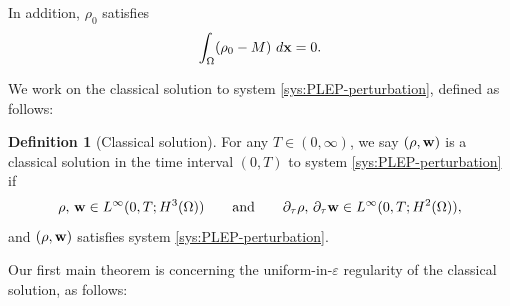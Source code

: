 \documentclass[11pt]{article}
\theoremstyle{plain}
\theoremstyle{definition}
\newtheorem{definition}[theorem]{Definition}
\theoremstyle{remark}
\newcommand{\dtau}{\partial_\tau}
\renewcommand{\vec}[1]{{\bf #1}}
\newcommand{\idx}{\ d\vec x}
\numberwithin{equation}{section}
\begin{document}
In addition,  $ \rho_0 $ satisfies
\begin{equation}
    \label{initial:002}
    \int_{\Omega} (\rho_0 - M) \idx = 0.
\end{equation}

We work on the classical solution to system \eqref{sys:PLEP-perturbation}, defined as follows:
\begin{definition}[Classical solution] 
    For any $ T \in (0,\infty) $, 
    we say $ (\rho, \vec w ) $ is a classical solution in the time interval $ (0,T) $ to system \eqref{sys:PLEP-perturbation} if 
    \begin{equation}
        \label{def:classical-sol}
        \rho, \, \vec w \in L^\infty(0,T;H^3(\Omega)) \qquad \text{and} \qquad \dtau \rho, \, \dtau \vec w \in L^\infty(0,T;H^2(\Omega)),
    \end{equation}
    and $ (\rho, \vec w) $ satisfies system \eqref{sys:PLEP-perturbation}. 
\end{definition}

Our first main theorem is concerning the uniform-in-$\varepsilon$ regularity of the classical solution, as follows: 
\end{document}
